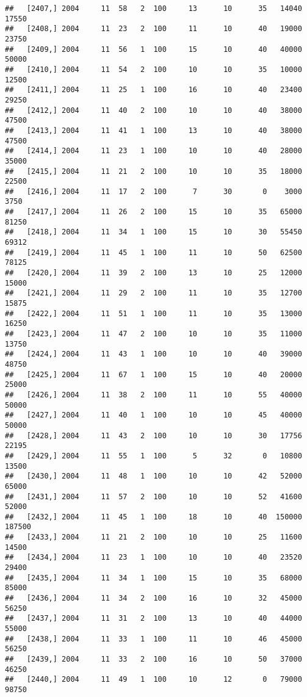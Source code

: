 \documentclass{article}\usepackage[]{graphicx}\usepackage[]{color}
\makeatletter
\newenvironment{kframe}{%
 \def\at@end@of@kframe{}%
 \ifinner\ifhmode%
  \def\at@end@of@kframe{\end{minipage}}%
  \begin{minipage}{\columnwidth}%
 \fi\fi%
 \def\FrameCommand##1{\hskip\@totalleftmargin \hskip-\fboxsep
 \colorbox{shadecolor}{##1}\hskip-\fboxsep
     \hskip-\linewidth \hskip-\@totalleftmargin \hskip\columnwidth}%
 \MakeFramed {\advance\hsize-\width
   \@totalleftmargin\z@ \linewidth\hsize
   \@setminipage}}%
 {\par\unskip\endMakeFramed%
 \at@end@of@kframe}
\newenvironment{knitrout}{}{} %
\makeatother
\begin{document}
\begin{knitrout}
\begin{kframe}
\begin{verbatim}
##   [2407,] 2004     11  58   2  100     13      10      35   14040   17550
##   [2408,] 2004     11  23   2  100     11      10      40   19000   23750
##   [2409,] 2004     11  56   1  100     15      10      40   40000   50000
##   [2410,] 2004     11  54   2  100     10      10      35   10000   12500
##   [2411,] 2004     11  25   1  100     16      10      40   23400   29250
##   [2412,] 2004     11  40   2  100     10      10      40   38000   47500
##   [2413,] 2004     11  41   1  100     13      10      40   38000   47500
##   [2414,] 2004     11  23   1  100     10      10      40   28000   35000
##   [2415,] 2004     11  21   2  100     10      10      35   18000   22500
##   [2416,] 2004     11  17   2  100      7      30       0    3000    3750
##   [2417,] 2004     11  26   2  100     15      10      35   65000   81250
##   [2418,] 2004     11  34   1  100     15      10      30   55450   69312
##   [2419,] 2004     11  45   1  100     11      10      50   62500   78125
##   [2420,] 2004     11  39   2  100     13      10      25   12000   15000
##   [2421,] 2004     11  29   2  100     11      10      35   12700   15875
##   [2422,] 2004     11  51   1  100     11      10      35   13000   16250
##   [2423,] 2004     11  47   2  100     10      10      35   11000   13750
##   [2424,] 2004     11  43   1  100     10      10      40   39000   48750
##   [2425,] 2004     11  67   1  100     15      10      40   20000   25000
##   [2426,] 2004     11  38   2  100     11      10      55   40000   50000
##   [2427,] 2004     11  40   1  100     10      10      45   40000   50000
##   [2428,] 2004     11  43   2  100     10      10      30   17756   22195
##   [2429,] 2004     11  55   1  100      5      32       0   10800   13500
##   [2430,] 2004     11  48   1  100     10      10      42   52000   65000
##   [2431,] 2004     11  57   2  100     10      10      52   41600   52000
##   [2432,] 2004     11  45   1  100     18      10      40  150000  187500
##   [2433,] 2004     11  21   2  100     10      10      25   11600   14500
##   [2434,] 2004     11  23   1  100     10      10      40   23520   29400
##   [2435,] 2004     11  34   1  100     15      10      35   68000   85000
##   [2436,] 2004     11  34   2  100     16      10      32   45000   56250
##   [2437,] 2004     11  31   2  100     13      10      40   44000   55000
##   [2438,] 2004     11  33   1  100     11      10      46   45000   56250
##   [2439,] 2004     11  33   2  100     16      10      50   37000   46250
##   [2440,] 2004     11  49   1  100     10      12       0   79000   98750

\end{verbatim}
\end{kframe}
\end{knitrout}
\end{document}
